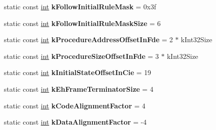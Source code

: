 \begin{DoxyCompactItemize}
static const \mbox{\hyperlink{classint}{int}} {\bfseries k\+Follow\+Initial\+Rule\+Mask} = 0x3f
\item 
\mbox{\label{classv8_1_1internal_1_1EhFrameConstants_a8f7f2943db881a8100802cfe6e693250}} 
static const \mbox{\hyperlink{classint}{int}} {\bfseries k\+Follow\+Initial\+Rule\+Mask\+Size} = 6
\item 
\mbox{\label{classv8_1_1internal_1_1EhFrameConstants_ab15d14301972098c38cdcb9b8c08f5ca}} 
static const \mbox{\hyperlink{classint}{int}} {\bfseries k\+Procedure\+Address\+Offset\+In\+Fde} = 2 $\ast$ k\+Int32\+Size
\item 
\mbox{\label{classv8_1_1internal_1_1EhFrameConstants_a314eb7a3531a3540f5971546bb9a25c6}} 
static const \mbox{\hyperlink{classint}{int}} {\bfseries k\+Procedure\+Size\+Offset\+In\+Fde} = 3 $\ast$ k\+Int32\+Size
\item 
\mbox{\label{classv8_1_1internal_1_1EhFrameConstants_a576809d19283505cb31e52227ada2756}} 
static const \mbox{\hyperlink{classint}{int}} {\bfseries k\+Initial\+State\+Offset\+In\+Cie} = 19
\item 
\mbox{\label{classv8_1_1internal_1_1EhFrameConstants_a35b3e087b0343eef8e87f4e879a80e86}} 
static const \mbox{\hyperlink{classint}{int}} {\bfseries k\+Eh\+Frame\+Terminator\+Size} = 4
\item 
\mbox{\label{classv8_1_1internal_1_1EhFrameConstants_ab783ff05c14fc226df9c169fb9259130}} 
static const \mbox{\hyperlink{classint}{int}} {\bfseries k\+Code\+Alignment\+Factor} = 4
\item 
\mbox{\label{classv8_1_1internal_1_1EhFrameConstants_a940209a30cdb93fd7162b5e515821496}} 
static const \mbox{\hyperlink{classint}{int}} {\bfseries k\+Data\+Alignment\+Factor} = -\/4
\item 
\mbox{\label{classv8_1_1internal_1_1EhFrameConstants_a4a42dca62b54053c40bf77093afd68d4}} 

\end{DoxyCompactItemize}
